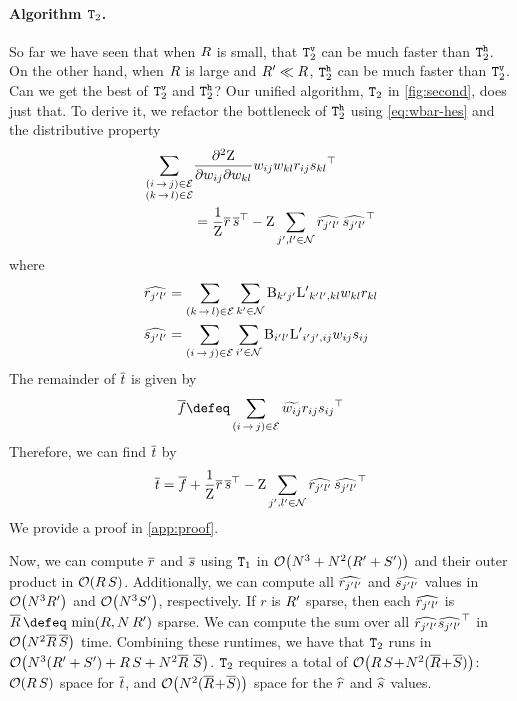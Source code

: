 \documentclass[11pt,a4paper]{article}
\theoremstyle{definition}
\begin{document}
\paragraph{Algorithm {\normalfont $\texttt{T}_2$}.}
So far we have seen that when ${R}$ is small, that $\texttt{T}_2^{\texttt{v}}$ can be much faster than $\texttt{T}_2^{\texttt{h}}$.
On the other hand, when ${R}$ is large and ${R'}\ll{R}$, $\texttt{T}_2^{\texttt{h}}$ can be much faster than $\texttt{T}_2^{\texttt{v}}$.
Can we get the best of $\texttt{T}_2^{\texttt{v}}$ and $\texttt{T}_2^{\texttt{h}}$?  Our unified algorithm, $\texttt{T}_2$ in \cref{fig:second}, does just that.  To derive it, we refactor the bottleneck of $\texttt{T}_2^{\texttt{h}}$ using \cref{eq:wbar-hes} and the distributive property\footnotemark{}  
\begin{align}
    \sum_{\substack{{(i\,{\rightarrow}\,j)}\in{\mathcal{E}} \\ {(k\,{\rightarrow}\,l)}\in{\mathcal{E}}}}& \frac{\partial^2{\mathrm{Z}}}{\partial{w_{ij}}\partial{w_{kl}}} {w_{ij}} {w_{kl}} {r_{ij}} {s_{kl}}^{\top} \nonumber \\
    &= \frac{1}{{\mathrm{Z}}}{\overline{r}}\, {\overline{s}}^\top - {\mathrm{Z}} \sum_{j',l'\in{\mathcal{N}}} {\widehat{r_{j'l'}}}\,{\widehat{s_{j'l'}}}^{\top}
\end{align}
where
\begin{align}
    {\widehat{r_{j'l'}}} &= \sum_{{(k\,{\rightarrow}\,l)}\in{\mathcal{E}}}\sum_{k'\in{\mathcal{N}}}{\mathrm{B}_{k'j'}}{{\mathrm{L}'}_{k'l',kl}}{w_{kl}}{r_{kl}} \\
    {\widehat{s_{j'l'}}} &= \sum_{{(i\,{\rightarrow}\,j)}\in{\mathcal{E}}}\sum_{i'\in{\mathcal{N}}}{\mathrm{B}_{i'l'}}{{\mathrm{L}'}_{i'j',ij}}{w_{ij}}{s_{ij}}
\end{align}
The remainder of ${\overline{t}}$ is given by
\begin{equation}
\total{f}\defeq\sum_{\edgeij\in\edges}\totalw{ij}\redge{ij}\sedge{ij}^\top
\end{equation}
Therefore, we can find ${\overline{t}}$ by
\begin{equation}\label{eq:tbar-eff}
    {\overline{t}} = {\overline{f}} + \frac{1}{{\mathrm{Z}}}{\overline{r}}\, {\overline{s}}^\top - {\mathrm{Z}} \sum_{j',l'\in{\mathcal{N}}} {\widehat{r_{j'l'}}}\,{\widehat{s_{j'l'}}}^{\top}
\end{equation}
We provide a proof in \cref{app:proof}.


Now, we can compute ${\overline{r}}$ and ${\overline{s}}$ using $\texttt{T}_1$
in $\mathcal{O}\!\left({N}^3 + {N}^2({R'}+{S'})\right)$ and their outer product in $\mathcal{O}\!\left({R}\,{S}\right)$.
Additionally, we can compute all ${\widehat{r_{j'l'}}}$ and ${\widehat{s_{j'l'}}}$ values in $\mathcal{O}\!\left({N}^3 {R'}\right)$ and $\mathcal{O}\!\left({N}^3 {S'}\right)$, respectively.  
If $r$ is ${R'}$ sparse, then each ${\widehat{r_{j'l'}}}$ is $\bar{\nR} \,{\defeq}\, \min(\nR, \nN\, \nRs)$ sparse. We can compute the sum over all ${\widehat{r_{j'l'}}}{\widehat{s_{j'l'}}}^{\top}$ in $\mathcal{O}\!\left({N}^2\overline{{R}}\,\overline{{S}}\right)$ time.
Combining these runtimes, we have that $\texttt{T}_2$
runs in $\bigo{\nN^3(\nRs+\nSs) + \nR\,\nS + \nN^2\bar{\nR}\ \bar{\nS}}$.
$\texttt{T}_2$ requires a total of $\mathcal{O}\!\left({R}\,{S} \!+\! {N}^2(\overline{{R}} \!+\! \overline{{S}})\right)$: $\mathcal{O}\!\left({R}\,{S}\right)$ space for ${\overline{t}}$, and $\mathcal{O}\!\left({N}^2(\overline{{R}} \!+\! \overline{{S}})\right)$ space for the ${\widehat{r_{}}}$ and ${\widehat{s_{}}}$ values.
\end{document}
